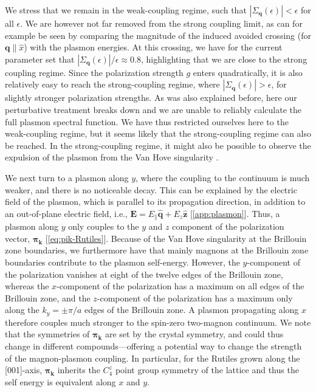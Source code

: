 \documentclass[aps,prb,reprint,twocolumns,superscriptaddress,nofootinbib]{revtex4-2}
\begin{document}
	We stress that we remain in the weak-coupling regime, such that $|\Sigma_{\bm q}(\epsilon)|<\epsilon$ for all $\epsilon$. We are however not far removed from the strong coupling limit, as can for example be seen by comparing the magnitude of the induced avoided crossing (for $\bm q\parallel \hat x$) with the plasmon energies. At this crossing, we have for the current parameter set that $|\Sigma_{\bm q}(\epsilon)|/\epsilon\approx0.8$, highlighting that we are close to the strong coupling regime.
	Since the polarization strength $g$ enters quadratically, it is also relatively easy to reach the strong-coupling regime, where $|\Sigma_{\bm q}(\epsilon)|>\epsilon$, for slightly stronger polarization strengths. As was also explained before, here our perturbative treatment breaks down and we are unable to reliably calculate the full plasmon spectral function. We have thus restricted ourselves here to the weak-coupling regime, but it seems likely that the strong-coupling regime can also be reached. In the strong-coupling regime, it might also be possible to observe the expulsion of the plasmon from the Van Hove singularity \cite{verresenAvoidedQuasiparticleDecay2019}.
	
	We next turn to a plasmon along ${y}$, where the coupling to the continuum is much weaker, and there is no noticeable decay. 
	This can be explained by the electric field of the plasmon, which is parallel to its propagation direction, in addition to an out-of-plane electric field, i.e., $\bm E =  E_{\parallel}\hat{\bm q} + E_z \hat{\bm z}$ [\cref{app:plasmon}]. Thus, a plasmon along ${y}$ only couples to the $y$ and $z$ component of the polarization vector, $\bm\pi_{\bm k}$ [\cref{eq:pik-Rutiles}]. Because of the Van Hove singularity at the Brillouin zone boundaries, we furthermore have that mainly magnons at the Brillouin zone boundaries contribute to the plasmon self-energy. However, the $y$-component of the polarization vanishes at eight of the twelve edges of the Brillouin zone, whereas the $x$-component of the polarization has a maximum on all edges of the Brillouin zone, and the $z$-component of the polarization has a maximum only along the $k_y=\pm \pi/a$ edges of the Brillouin zone. A plasmon propagating along $x$ therefore couples much stronger to the spin-zero two-magnon continuum. We note that the symmetries of $\bm\pi_{\bm k}$ are set by the crystal symmetry, and could thus change in different compounds---offering a potential way to change the strength of the magnon-plasmon coupling. In particular, for the Rutiles grown along the [001]-axis, $\bm\pi_{\bm k}$ inherits the $C_4^z$ point group symmetry of the lattice and thus the self energy is equivalent along $x$ and $y$.
	
\end{document}
